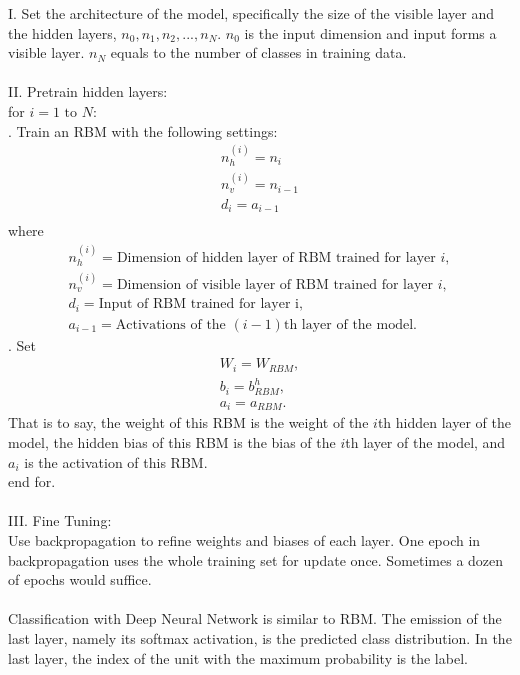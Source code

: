\documentclass[12pt]{article}
\begin{document}
I. Set the architecture of the model, specifically the size of the visible layer and the hidden layers, \(n_0, n_1, n_2, ..., n_N\). $n_0$ is the input dimension and input forms a visible layer. $n_N$ equals to the number of classes in training data.\\
\\
II. Pretrain hidden layers:\\
for $i = 1\text{ to }N $:\\
. Train an RBM with the following settings:\\
\begin{gather}
n_h^{(i)}=n_i\\
n_v^{(i)}=n_{i-1}\\
d_i=a_{i-1}\\
\end{gather}
\indent where
\begin{gather}
n_h^{(i)} = \text{Dimension of hidden layer of RBM trained for layer }i,\\
n_v^{(i)} = \text{Dimension of visible layer of RBM trained for layer }i,\\
d_i = \text{Input of RBM trained for layer i},\\
a_{i-1} = \text{Activations of the }(i-1)\text{th layer of the model}.
\end{gather}
. Set \begin{gather}
W_i = W_{RBM},\\
b_i = b^h_{RBM},\\
a_i = a_{RBM}.
\end{gather}
\indent That is to say, the weight of this RBM is the weight of the $i$th hidden layer of the model, the hidden bias of this RBM is the bias of the $i$th layer of the model, and $a_i$ is the activation of this RBM.\\
end for.\\
\\
III. Fine Tuning:\\
Use backpropagation to refine weights and biases of each layer. One epoch in backpropagation uses the whole training set for update once. Sometimes a dozen of epochs would suffice.\\
\\
Classification with Deep Neural Network is similar to RBM. The emission of the last layer, namely its softmax activation, is the predicted class distribution. In the last layer, the index of the unit with the maximum probability is the label. 
\end{document}
